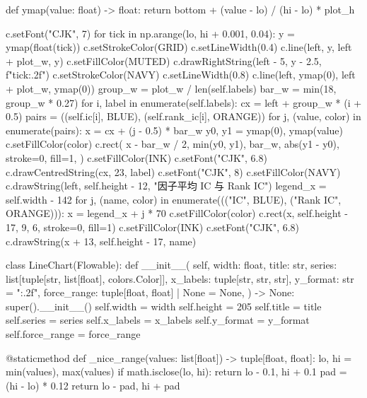 \documentclass[UTF8,a4paper,fontset=fandol]{ctexart}
\begin{document}
\begin{ProjectCode}
        def ymap(value: float) -> float:
            return bottom + (value - lo) / (hi - lo) * plot_h

        c.setFont("CJK", 7)
        for tick in np.arange(lo, hi + 0.001, 0.04):
            y = ymap(float(tick))
            c.setStrokeColor(GRID)
            c.setLineWidth(0.4)
            c.line(left, y, left + plot_w, y)
            c.setFillColor(MUTED)
            c.drawRightString(left - 5, y - 2.5, f"{tick:.2f}")
        c.setStrokeColor(NAVY)
        c.setLineWidth(0.8)
        c.line(left, ymap(0), left + plot_w, ymap(0))
        group_w = plot_w / len(self.labels)
        bar_w = min(18, group_w * 0.27)
        for i, label in enumerate(self.labels):
            cx = left + group_w * (i + 0.5)
            pairs = ((self.ic[i], BLUE), (self.rank_ic[i], ORANGE))
            for j, (value, color) in enumerate(pairs):
                x = cx + (j - 0.5) * bar_w
                y0, y1 = ymap(0), ymap(value)
                c.setFillColor(color)
                c.rect(
                    x - bar_w / 2,
                    min(y0, y1),
                    bar_w,
                    abs(y1 - y0),
                    stroke=0,
                    fill=1,
                )
            c.setFillColor(INK)
            c.setFont("CJK", 6.8)
            c.drawCentredString(cx, 23, label)
        c.setFont("CJK", 8)
        c.setFillColor(NAVY)
        c.drawString(left, self.height - 12, "因子平均 IC 与 Rank IC")
        legend_x = self.width - 142
        for j, (name, color) in enumerate((("IC", BLUE), ("Rank IC", ORANGE))):
            x = legend_x + j * 70
            c.setFillColor(color)
            c.rect(x, self.height - 17, 9, 6, stroke=0, fill=1)
            c.setFillColor(INK)
            c.setFont("CJK", 6.8)
            c.drawString(x + 13, self.height - 17, name)


class LineChart(Flowable):
    def __init__(
        self,
        width: float,
        title: str,
        series: list[tuple[str, list[float], colors.Color]],
        x_labels: tuple[str, str, str],
        y_format: str = "{:.2f}",
        force_range: tuple[float, float] | None = None,
    ) -> None:
        super().__init__()
        self.width = width
        self.height = 205
        self.title = title
        self.series = series
        self.x_labels = x_labels
        self.y_format = y_format
        self.force_range = force_range

    @staticmethod
    def _nice_range(values: list[float]) -> tuple[float, float]:
        lo, hi = min(values), max(values)
        if math.isclose(lo, hi):
            return lo - 0.1, hi + 0.1
        pad = (hi - lo) * 0.12
        return lo - pad, hi + pad


\end{ProjectCode}
\end{document}
